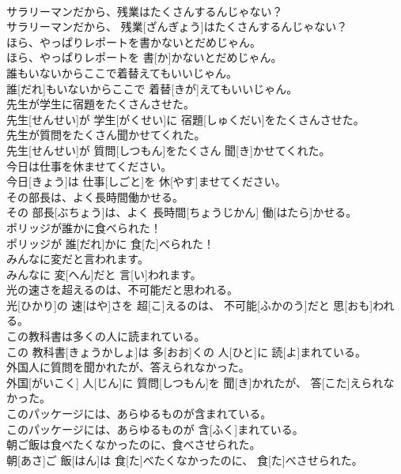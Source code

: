 \documentclass[8pt]{extreport}
\begin{document}
\begin{CJK}{UTF8}{min}
\\	サラリーマンだから、残業はたくさんするんじゃない？	
\\	サラリーマンだから、 残業[ざんぎょう]はたくさんするんじゃない？	
\\	ほら、やっぱりレポートを書かないとだめじゃん。	
\\	ほら、やっぱりレポートを 書[か]かないとだめじゃん。	
\\	誰もいないからここで着替えてもいいじゃん。	
\\	誰[だれ]もいないからここで 着替[きが]えてもいいじゃん。	
\\	先生が学生に宿題をたくさんさせた。	
\\	先生[せんせい]が 学生[がくせい]に 宿題[しゅくだい]をたくさんさせた。	
\\	先生が質問をたくさん聞かせてくれた。	
\\	先生[せんせい]が 質問[しつもん]をたくさん 聞[き]かせてくれた。	
\\	今日は仕事を休ませてください。	
\\	今日[きょう]は 仕事[しごと]を 休[やす]ませてください。	
\\	その部長は、よく長時間働かせる。	
\\	その 部長[ぶちょう]は、よく 長時間[ちょうじかん] 働[はたら]かせる。	
\\	ポリッジが誰かに食べられた！	
\\	ポリッジが 誰[だれ]かに 食[た]べられた！	
\\	みんなに変だと言われます。	
\\	みんなに 変[へん]だと 言[い]われます。	
\\	光の速さを超えるのは、不可能だと思われる。	
\\	光[ひかり]の 速[はや]さを 超[こ]えるのは、 不可能[ふかのう]だと 思[おも]われる。	
\\	この教科書は多くの人に読まれている。	
\\	この 教科書[きょうかしょ]は 多[おお]くの 人[ひと]に 読[よ]まれている。	
\\	外国人に質問を聞かれたが、答えられなかった。	
\\	外国[がいこく] 人[じん]に 質問[しつもん]を 聞[き]かれたが、 答[こた]えられなかった。	
\\	このパッケージには、あらゆるものが含まれている。	
\\	このパッケージには、あらゆるものが 含[ふく]まれている。	
\\	朝ご飯は食べたくなかったのに、食べさせられた。	
\\	朝[あさ]ご 飯[はん]は 食[た]べたくなかったのに、 食[た]べさせられた。	

\end{CJK}
\end{document}

